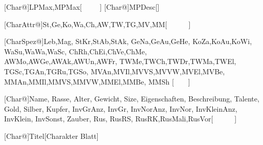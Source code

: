 \makeatletter
{}[Char@]{LPMax,MPMax}[\ \ \ \ \ ]
[Char@]{MPDesc}[]

[CharAttr@]{St,Ge,Ko,Wa,Ch,AW,TW,TG,MV,MM}[\ \ \ \ \ \ ]

[CharSpez@]{Leb,Mag,
										StKr,StAb,StAk,
										GeNa,GeAu,GeHe,
										KoZa,KoAu,KoWi,
										WaSu,WaWa,WaSc,
										ChRh,ChEi,ChVe,ChMe,
										AWMo,AWGe,AWAk,AWUn,AWFr,
										TWMe,TWCh,TWDr,TWMa,TWEl,
										TGSc,TGAn,TGRu,TGSo,
										MVAn,MVIl,MVVS,MVVW,MVEl,MVBe,
										MMAn,MMIl,MMVS,MMVW,MMEl,MMBe, MMSh}
										[\ \ \ \ ]

[Char@]{Name, Rasse, Alter, Gewicht, Size,
				Eigenschaften,
				Beschreibung,
				Talente,
				Gold, Silber, Kupfer,
				InvGrAnz, InvGr, InvNorAnz, InvNor, InvKleinAnz, InvKlein, InvSonst,
				Zauber,
				Rus, RusRS, RusRK,RusMali,RusVor}[\ \ \ \ \ \ ]

[Char@]{Titel}[Charakter Blatt]


\newcommand{\FillCell}[1]{
	\setstretch{0}\begin{normalsize}#1 \end{normalsize}
}

\newcommand{\CharacterSheetUser}{
\setkeys{CharacterSheet}{LPMax,MPMax,MPDesc}
\setkeys{CharacterSheet}{St,Ge,Ko,Wa,Ch,AW,TW,TG,MV,MM}
\setkeys{CharacterSheet}{Leb,Mag,
							StKr,StAb,StAk,
							GeNa,GeAu,GeHe,
							KoZa,KoAu,KoWi,
							WaSu,WaWa,WaSc,
							ChRh,ChEi,ChVe,ChMe,
							AWMo,AWGe,AWAk,AWUn,AWFr,
							TWMe,TWCh,TWDr,TWMa,TWEl,
							TGSc,TGAn,TGRu,TGSo,
							MVAn,MVIl,MVVS,MVVW,MVEl,MVBe,
							MMAn,MMIl,MMVS,MMVW,MMEl,MMBe, MMSh}
\setkeys{CharacterSheet}{Titel, Name, Rasse, Alter, Gewicht, Size,
				Eigenschaften,
				Beschreibung,
				Talente,
				Gold, Silber, Kupfer,
				InvGrAnz, InvGr, InvNorAnz, InvNor, InvKleinAnz, InvKlein, InvSonst,
				Zauber,
				Rus, RusRS, RusRK,RusMali,RusVor}
}

\newcommand{\txtfld}[3][1cm]{
	\TextField[borderstyle=I,value=#3,borderwidth=0,width=#1,height=0.8\baselineskip]{#2:}
}
\newcommand{\txtfldSilent}[3][1cm]{
	\TextField[borderstyle=I,value=#3,borderwidth=0,width=#1,name=#2,height=0.8\baselineskip]{}
}
\newcommand{\txtfldBig}[4][1cm]{	\TextField[borderstyle=I,value=#3,borderwidth=0,multiline=true,width=#1,name=#2,height=(0.8+2-1)*\baselineskip]{}
}

